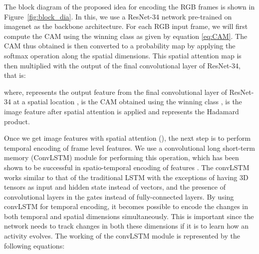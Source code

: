 \documentclass{bmvc2k}
\begin{document}
The block diagram of the proposed idea for encoding the RGB frames is shown in Figure~\ref{fig:block_dia}. In this, we use a ResNet-34 network pre-trained on imagenet as the backbone architecture. For each RGB input frame, we will first compute the CAM using the winning class as given by equation \ref{eq:CAM}. The CAM thus obtained is then converted to a probability map by applying the softmax operation along the spatial dimensions. This spatial attention map is then multiplied with the output of the final convolutional layer of ResNet-34, that is:

where,  represents the output feature from the final convolutional layer of ResNet-34 at a spatial location ,  is the CAM obtained using the winning class ,  is the image feature after spatial attention is applied and  represents the Hadamard product.

Once we get image features with spatial attention (), the next step is to perform temporal encoding of frame level features. We use a convolutional long short-term memory (ConvLSTM) module for performing this operation, which has been shown to be successful in spatio-temporal encoding of features \cite{medel2016anomaly} \cite{sudhakaran2017learning} \cite{Sudhakaran_2017_ICCV}. The convLSTM works similar to that of the traditional LSTM with the exceptions of having 3D tensors as input and hidden state instead of vectors, and the presence of convolutional layers in the gates instead of fully-connected layers. By using convLSTM for temporal encoding, it becomes possible to encode the changes in both temporal and spatial dimensions simultaneously. This is important since the network needs to track changes in both these dimensions if it is to learn how an activity evolves. The working of the convLSTM module is represented by the following equations:
\end{document}
